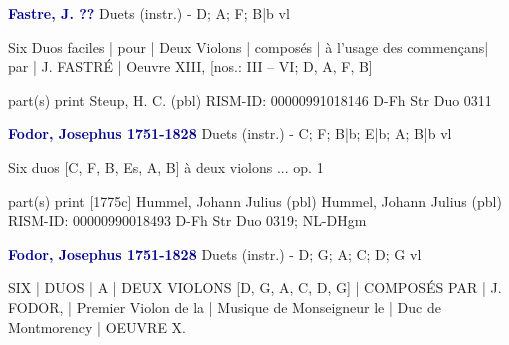 \documentclass[twocolumn]{book}
\begin{document}
\newline \par \vspace{7pt} \textcolor{darkblue}{\textbf{Fastre, J.  ??}}
\newline Duets (instr.) - D; A; F; B|b
 vl
\newline \begin{itshape}Six Duos faciles | pour | Deux Violons | composés | à l'usage des commençans| par | J. FASTRÉ | Oeuvre XIII, [nos.: III – VI; D, A, F, B]\end{itshape} 
\newline \textcolor{darkblue}{}  part(s)
\newline print
\newline Steup, H. C.  (pbl)
\newline RISM-ID: 00000991018146
\newline D-Fh  Str Duo 0311
\newline \par \vspace{7pt} \textcolor{darkblue}{\textbf{Fodor, Josephus  1751-1828}}
\newline Duets (instr.) - C; F; B|b; E|b; A; B|b
 vl
\newline \begin{itshape}Six duos [C, F, B, Es, A, B] à deux violons ... op. 1\end{itshape} 
\newline \textcolor{darkblue}{}  part(s)
\newline print  [1775c]
\newline Hummel, Johann Julius  (pbl)
\newline Hummel, Johann Julius  (pbl)
\newline RISM-ID: 00000990018493
\newline D-Fh  Str Duo 0319; NL-DHgm
\newline \par \vspace{7pt} \textcolor{darkblue}{\textbf{Fodor, Josephus  1751-1828}}
\newline Duets (instr.) - D; G; A; C; D; G
 vl
\newline \begin{itshape}SIX | DUOS | A | DEUX VIOLONS [D, G, A, C, D, G] | COMPOSÉS PAR | J. FODOR, | Premier Violon de la | Musique de Monseigneur le | Duc de Montmorency | OEUVRE X.\end{itshape} 
\end{document}
